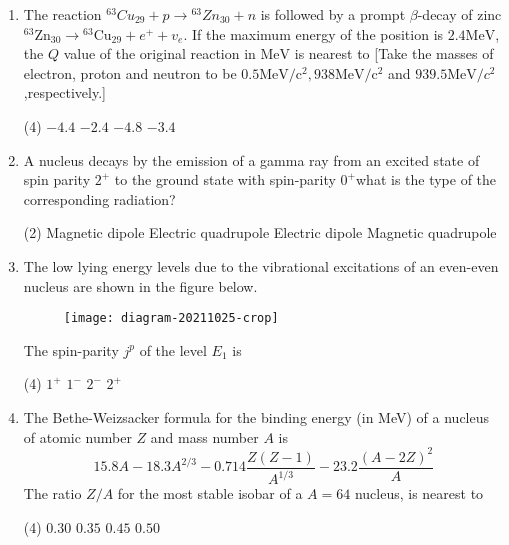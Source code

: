 \begin{enumerate}
	\item The reaction ${ }^{63} C u_{29}+p \rightarrow{ }^{63} Z n_{30}+n$ is followed by a prompt $\beta$-decay of zinc ${ }^{63} \mathrm{Zn}_{30} \rightarrow{ }^{63} \mathrm{Cu}_{29}+e^{+}+v_{e} .$ If the maximum energy of the position is $2.4 \mathrm{MeV}$, the $Q$ value of the original reaction in $\mathrm{MeV}$ is nearest to
	[Take the masses of electron, proton and neutron to be $0.5 \mathrm{MeV} / \mathrm{c}^{2}, 938 \mathrm{MeV} / \mathrm{c}^{2}$ and $939.5 \mathrm{MeV} / c^{2}$,respectively.]
	{	}
	\begin{tasks}(4)
		\task[\textbf{A.}] $-4.4$
		\task[\textbf{B.}] $-2.4$
		\task[\textbf{C.}] $-4.8$
		\task[\textbf{D.}] $-3.4$
	\end{tasks}
	\item A nucleus decays by the emission of a gamma ray from an excited state of spin parity $2^{+}$ to the ground state with spin-parity $0^{+}$what is the type of the corresponding radiation?
	{}
	\begin{tasks}(2)
		\task[\textbf{A.}] Magnetic dipole
		\task[\textbf{B.}] Electric quadrupole
		\task[\textbf{C.}]  Electric dipole
		\task[\textbf{D.}] Magnetic quadrupole
	\end{tasks}
	\item The low lying energy levels due to the vibrational excitations of an even-even nucleus are shown in the figure below.\\
	\begin{figure}[H]
		\centering
		\texttt{[image: diagram-20211025-crop]}
	\end{figure}
	The spin-parity $j^{p}$ of the level $E_{1}$ is
	{	}
	\begin{tasks}(4)
		\task[\textbf{A.}] $1^+$
		\task[\textbf{B.}] $1^-$
		\task[\textbf{C.}] $2^-$
		\task[\textbf{D.}] $2^+$ 
	\end{tasks}
	\item The Bethe-Weizsacker formula for the binding energy (in MeV) of a nucleus of atomic number $Z$ and mass number $A$ is
	$$
	15.8 A-18.3 A^{2 / 3}-0.714 \frac{Z(Z-1)}{A^{1 / 3}}-23.2 \frac{(A-2 Z)^{2}}{A}
	$$
	The ratio $Z / A$ for the most stable isobar of a $A=64$ nucleus, is nearest to
	{	}
	\begin{tasks}(4)
		\task[\textbf{A.}] $0.30$
		\task[\textbf{B.}] $0.35$
		\task[\textbf{C.}] $0.45$
		\task[\textbf{D.}] $0.50$
	\end{tasks}

\end{enumerate}
